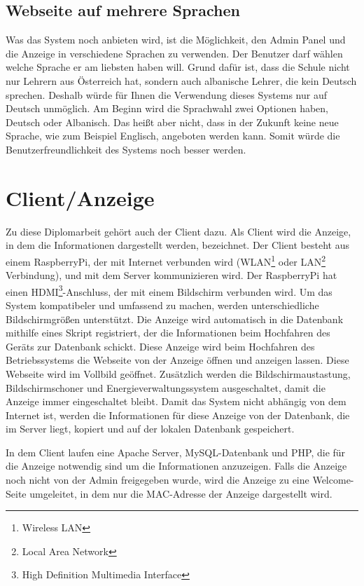 \subsection{Webseite auf mehrere Sprachen}

Was das System noch anbieten wird, ist die Möglichkeit, den Admin Panel und die Anzeige in verschiedene Sprachen zu verwenden. Der Benutzer darf wählen welche Sprache er am liebsten haben will. Grund dafür ist, dass die Schule nicht nur Lehrern aus Österreich hat, sondern auch albanische Lehrer, die kein Deutsch sprechen. Deshalb würde für Ihnen die Verwendung dieses Systems nur auf Deutsch unmöglich. Am Beginn wird die Sprachwahl zwei Optionen haben, Deutsch oder Albanisch. Das heißt aber nicht, dass in der Zukunft keine neue Sprache, wie zum Beispiel Englisch, angeboten werden kann. Somit würde die Benutzerfreundlichkeit des Systems noch besser werden.

\section{Client/Anzeige}

Zu diese Diplomarbeit geh\"{o}rt auch der Client dazu. Als Client wird die Anzeige, in dem die Informationen dargestellt werden, bezeichnet. Der Client besteht aus einem RaspberryPi, der mit Internet verbunden wird (WLAN\footnote{Wireless LAN} oder LAN\footnote{Local Area Network} Verbindung), und mit dem Server kommunizieren wird. Der RaspberryPi hat einen HDMI\footnote{High Definition Multimedia Interface}-Anschluss, der mit einem Bildschirm verbunden wird. Um das System kompatibeler und umfassend zu machen, werden unterschiedliche Bildschirmgr\"{o}\ss{}en unterst\"{u}tzt. Die Anzeige wird automatisch  in die Datenbank mithilfe eines Skript registriert, der die Informationen beim Hochfahren des Ger\"{a}ts zur Datenbank schickt. Diese Anzeige wird beim Hochfahren des Betriebssystems die Webseite von der Anzeige \"{o}ffnen und anzeigen lassen. Diese Webseite wird im Vollbild ge\"{o}ffnet. Zus\"{a}tzlich werden die Bildschirmaustastung, Bildschirmschoner und Energieverwaltungssystem ausgeschaltet, damit die Anzeige immer eingeschaltet bleibt. Damit das System nicht abh\"{a}ngig von dem Internet ist, werden die Informationen f\"{u}r diese Anzeige von der Datenbank, die im Server liegt, kopiert und auf der lokalen Datenbank gespeichert. 

In dem Client laufen eine Apache Server, MySQL-Datenbank und PHP, die f\"{u}r die Anzeige notwendig sind um die Informationen anzuzeigen. Falls die Anzeige noch nicht von der Admin freigegeben wurde, wird die Anzeige zu eine Welcome-Seite umgeleitet, in dem nur die MAC-Adresse der Anzeige dargestellt wird.

